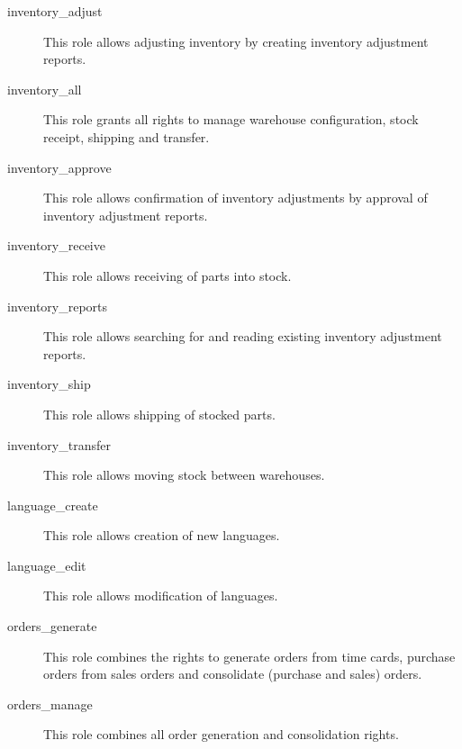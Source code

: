 \begin{description}
\item [inventory\_adjust] \htmlspacing 
                         This role allows adjusting inventory by creating inventory adjustment reports.
\item [inventory\_all] \htmlspacing 
                         This role grants all rights to manage warehouse configuration, stock receipt, shipping and transfer.
\item [inventory\_approve] \htmlspacing 
                         This role allows confirmation of inventory adjustments by approval of inventory adjustment reports.
\item [inventory\_receive] \htmlspacing 
                         This role allows receiving of parts into stock.
\item [inventory\_reports] \htmlspacing 
                         This role allows searching for and reading existing inventory adjustment reports.
\item [inventory\_ship] \htmlspacing 
                         This role allows shipping of stocked parts.
\item [inventory\_transfer] \htmlspacing 
                         This role allows moving stock between warehouses.
\item [language\_create] \htmlspacing 
                         This role allows creation of new languages.
\item [language\_edit] \htmlspacing 
                         This role allows modification of languages.
\item [orders\_generate] \htmlspacing 
                         This role combines the rights to generate orders from
                         time cards, purchase orders from sales orders
                         and consolidate (purchase and sales) orders.
\item [orders\_manage] \htmlspacing 
                         This role combines all order generation and
                         consolidation rights.

\end{description}
